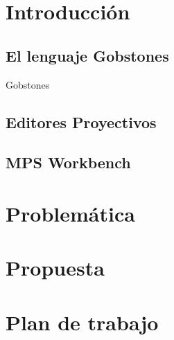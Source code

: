 \section{Introducción}

\subsection{El lenguaje Gobstones}

Gobstones\cite{Gobstones} 

\subsection{Editores Proyectivos}

\subsection{MPS Workbench}

\section{Problemática}

\section{Propuesta}

\section{Plan de trabajo}
